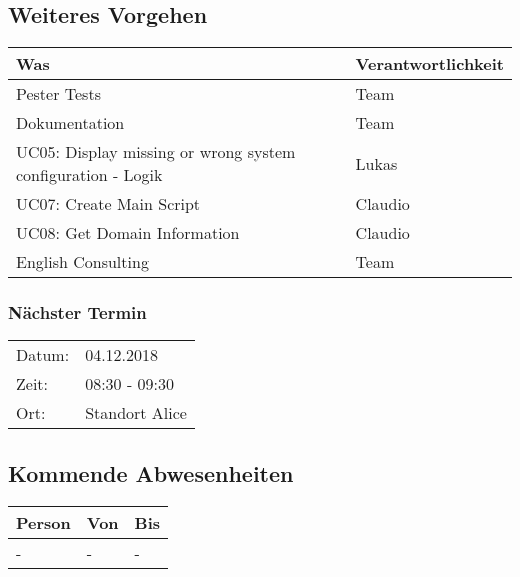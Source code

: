\vspace{1cm}

\subsection*{Weiteres Vorgehen}
\begin{table}[H]
    \centering
    \begin{tabular}{p{12cm} p{4cm}}
        \textbf{Was} & \textbf{Verantwortlichkeit} \\ \hline
        Pester Tests & Team \\ \hline
        Dokumentation & Team\\ \hline
        UC05: Display missing or wrong system configuration - Logik & Lukas \\ \hline
        UC07: Create Main Script & Claudio \\ \hline
        UC08: Get Domain Information & Claudio \\ \hline
        English Consulting & Team \\ \hline
    \end{tabular}
\end{table}

\clearpage

\subsubsection*{Nächster Termin}

\begin{tabular}{p{4cm} p{12cm}}
    Datum: & 04.12.2018 \\
    Zeit: & 08:30 - 09:30 \\
    Ort: & Standort Alice \\
\end{tabular}

\vspace{1cm}

\subsection*{Kommende Abwesenheiten}
\begin{table}[H]
    \centering
    \begin{tabular}{p{6cm} p{5cm} p{5cm}}
        \textbf{Person} & \textbf{Von} & \textbf{Bis} \\ \hline
        - & - & - \\ \hline
    \end{tabular}
\end{table}

